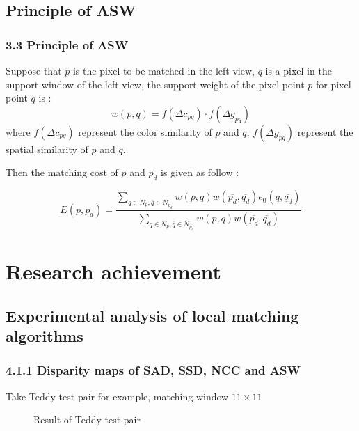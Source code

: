 \documentclass{beamer}
\begin{document}
\subsection{Principle of ASW}
\begin{frame}
\frametitle{3.3 Principle of ASW}
Suppose that $p$ is the pixel to be matched in the left view, $q$ is a pixel in the support window of the left view, the support weight of the pixel point $p$ for pixel point $q$ is :
\begin{equation}
w(p,q)=f(\Delta c_{pq})\cdot f(\Delta g_{pq})
\end{equation}
where $f(\Delta c_{pq})$ represent the color similarity of $p$ and $q$, $f(\Delta g_{pq})$ represent the spatial similarity of $p$ and $q$.

Then the matching cost of $p$ and $\overline{p_d}$ is given as follow :

\begin{equation}
E(p,\overline{p_d}) = \frac {\sum_{q\in N_p,\overline{q}\in N_{\overline{p_d}}}w(p,q)w(\overline{p_d},\overline{q_d})e_0(q,\overline{q_d})} {\sum_{q\in N_p,\overline{q}\in N_{\overline{p_d}}}w(p,q)w(\overline{p_d},\overline{q_d})}
\end{equation}

\end{frame}

\section{Research achievement}
\subsection{Experimental analysis of local matching algorithms}
\begin{frame}
\frametitle{4.1.1 Disparity maps of SAD, SSD, NCC and ASW}
Take Teddy test pair for example, matching window $11\times11$

\begin{figure}
\centering
{}
\caption{Result of Teddy test pair}
\end{figure}
\end{frame}
\end{document}
